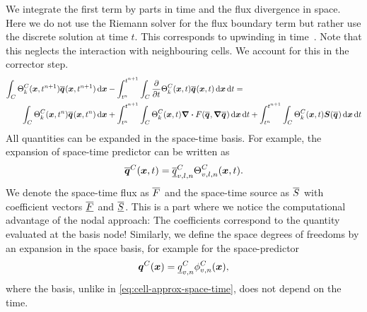 We integrate the first term by parts in time and the flux divergence in space.
Here we do not use the Riemann solver for the flux boundary term but rather use the discrete solution at time $t$.
This corresponds to upwinding in time~\cite{dumbser2008unified}.
Note that this neglects the interaction with neighbouring cells.
We account for this in the corrector step.
\begin{align}\label{eq:space-time-predictor}
\begin{split}
\intdcell{
  \sttestfunction[\cell][k] (\bm{x}, t^{n+1}) \stpredictor(\bm{x}, t^{n+1})
}
&-
\intdt{\intdcell{
    \pdv{}{t} \sttestfunction[\cell][k] (\bm{x}, t) \stpredictor(\bm{x}, t)
}}
= \\
\intdcell{
  \sttestfunction[\cell][k] (\bm{x},t^n) \stpredictor(\bm{x}, t^n)
}
&+
\intdt{\intdcell{
    \sttestfunction[\cell][k] (\bm{x},t) \divergence{\flux(\stpredictor, \gradient{\stpredictor})}
}}
+
\intdt{\intdcell{
    \sttestfunction[\cell][k] (\bm{x}, t) \source(\stpredictor)
}}
\end{split}
\end{align}
All quantities can be expanded in the space-time basis.
For example, the expansion of space-time predictor can be written as
\begin{equation}
  \label{eq:cell-approx-space-time}
  \stpredictor[\cell] (\bm{x}, t) = \stpredictorCoeff[\cell][v,l,n] \stbasis[\cell][v,l,n](\bm{x}, t).
\end{equation}
We denote the space-time flux as $\stflux$ and the space-time source as $\stsource$ with coefficient vectors $\stfluxCoeff$ and $\stsourceCoeff$.
This is a part where we notice the computational advantage of the nodal approach:
The coefficients correspond to the quantity evaluated at the basis node!
Similarly, we define the space degrees of freedoms by an expansion in the space basis, for example for the space-predictor
\begin{equation}
  \label{eq:cell-approx-space}
  \spredictor[\cell] (\bm{x}) = \spredictorCoeff[\cell][v,n] \sbasis[\cell][v,n] (\bm{x}),
\end{equation}
where the basis, unlike in \cref{eq:cell-approx-space-time}, does not depend on the time.



